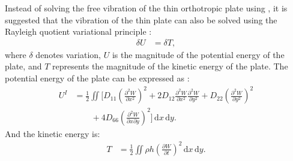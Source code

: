 \documentclass[preprint,12pt]{elsarticle}
\begin{document}
Instead of solving the free vibration of the thin orthotropic plate using , it is suggested that the vibration of the thin plate can also be solved using the Rayleigh quotient variational principle \cite{xing2018overall}:
%
\begin{equation}\label{eq:Rayleigh}
	\begin{split}
		\delta U &= \delta T,
	\end{split}
\end{equation}
%
%
where $\delta$ denotes variation, $U$ is the magnitude of the potential energy of the plate, and $T$ represents the magnitude of the kinetic energy of the plate.
The potential energy of the plate can be expressed as \cite{xing2020extended}:
%
%
\begin{equation}\label{eq:poten_energy}
	\begin{split}
		U^{I} &= \frac{1}{2}\iint \Bigg[D_{11}\left(\frac{\partial^2 W}{\partial x^2}\right)^2 + 2D_{12}\frac{\partial^2 W}{\partial x^2}\frac{\partial^2 W}{\partial y^2} + D_{22}\left(\frac{\partial^2 W}{\partial y^2}\right)^2 \\
		&\qquad + 4D_{66}\left(\frac{\partial^2 W}{\partial x \partial y}\right)^2\Bigg] \, \mathrm{d}x \, \mathrm{d}y.
	\end{split}
\end{equation}
%
And the kinetic energy is:
%
\begin{equation}\label{eq:kine_energy}
	\begin{split}
		T &= \frac{1}{2}\iint \rho h \left(\frac{\partial W}{\partial t}\right)^2 \, \mathrm{d}x \, \mathrm{d}y.
	\end{split}
\end{equation}
\end{document}
